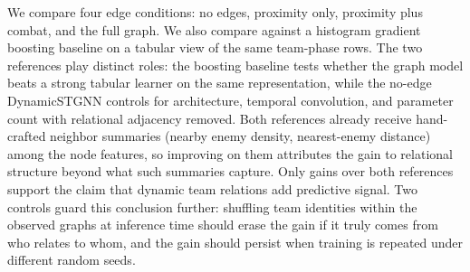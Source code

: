 We compare four edge conditions: no edges, proximity only, proximity plus
combat, and the full graph. We also compare against a histogram gradient
boosting baseline on a tabular view of the same team-phase rows. The two
references play distinct roles: the boosting baseline tests whether the graph
model beats a strong tabular learner on the same representation, while the
no-edge DynamicSTGNN controls for architecture, temporal convolution, and
parameter count with relational adjacency removed. Both references already receive hand-crafted neighbor summaries
(nearby enemy density, nearest-enemy distance) among the node features, so
improving on them attributes the gain to relational structure beyond what
such summaries capture. Only gains over both references support the claim
that dynamic team relations add predictive signal. Two controls guard this
conclusion further: shuffling team identities within the observed graphs at
inference time should erase the gain if it truly comes from who relates to
whom, and the gain should persist when training is repeated under different
random seeds.
